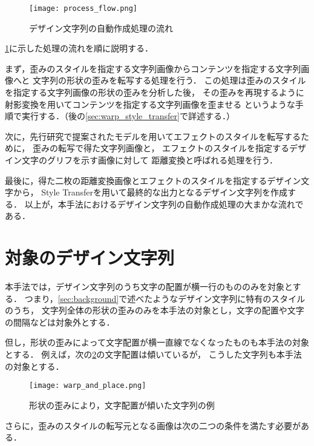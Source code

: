 \documentclass[\homedir/main.tex]{subfiles}
\begin{document}
\begin{figure}[h]
    \centering
    \texttt{[image: process\_flow.png]}
    \caption{デザイン文字列の自動作成処理の流れ}
    \label{fig:process_flow}
\end{figure}

\cref{fig:process_flow}に示した処理の流れを順に説明する．

まず，歪みのスタイルを指定する文字列画像からコンテンツを指定する文字列画像へと
文字列の形状の歪みを転写する処理を行う．
この処理は歪みのスタイルを指定する文字列画像の形状の歪みを分析した後，
その歪みを再現するように射影変換を用いてコンテンツを指定する文字列画像を歪ませる
というような手順で実行する．（後の\cref{sec:warp_style_transfer}で詳述する．）

次に，先行研究\cite{typography2019}で提案されたモデルを用いてエフェクトのスタイルを転写するために，
歪みの転写で得た文字列画像と，
エフェクトのスタイルを指定するデザイン文字のグリフを示す画像に対して
距離変換と呼ばれる処理を行う．

最後に，得た二枚の距離変換画像とエフェクトのスタイルを指定するデザイン文字から，
Style Transferを用いて最終的な出力となるデザイン文字列を作成する．
以上が，本手法におけるデザイン文字列の自動作成処理の大まかな流れである．

\section{対象のデザイン文字列}\label{sec:target_design_text}
本手法では，デザイン文字列のうち文字の配置が横一行のもののみを対象とする．
つまり，\cref{sec:background}で述べたようなデザイン文字列に特有のスタイルのうち，
文字列全体の形状の歪みのみを本手法の対象とし，文字の配置や文字の間隔などは対象外とする．

但し，形状の歪みによって文字配置が横一直線でなくなったものも本手法の対象とする．
例えば，次の\cref{fig:warp_and_place}の文字配置は傾いているが，
こうした文字列も本手法の対象とする．

\begin{figure}[h]
    \centering
    \texttt{[image: warp\_and\_place.png]}
    \caption{形状の歪みにより，文字配置が傾いた文字列の例}
    \label{fig:warp_and_place}
\end{figure}

さらに，歪みのスタイルの転写元となる画像は次の二つの条件を満たす必要がある．
\end{document}
